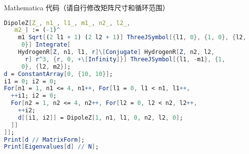Mathematica 代码（请自行修改矩阵尺寸和循环范围）
\begin{lstlisting}[language=Mathematica]
DipoleZ[Z_, n1_, l1_, m1_, n2_, l2_, 
   m2_] := (-1)^
    m1 Sqrt[(2 l1 + 1) (2 l2 + 1)] ThreeJSymbol[{l1, 0}, {1, 0}, {l2, 
     0}] Integrate[
    HydrogenR[Z, n1, l1, r]\[Conjugate] HydrogenR[Z, n2, l2, 
      r] r^3, {r, 0, +\[Infinity]}] ThreeJSymbol[{l1, -m1}, {1, 
     0}, {l2, m2}];
d = ConstantArray[0, {10, 10}];
i1 = 0; i2 = 0;
For[n1 = 1, n1 <= 4, n1++, For[l1 = 0, l1 < n1, l1++,
  ++i1; i2 = 0;
  For[n2 = 1, n2 <= 4, n2++, For[l2 = 0, l2 < n2, l2++,
    ++i2;
    d[[i1, i2]] = DipoleZ[1, n1, l1, 0, n2, l2, 0];
  ]]
]];
Print[d // MatrixForm];
Print[Eigenvalues[d] // N];
\end{lstlisting}
